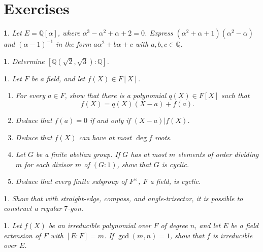 \documentclass[a4paper,11pt,final,openany]{memoir}
\newtheorem{exercise}[Y]{}
\theoremstyle{nonumberplain}
\begin{document}
\section{Exercises}

\begin{exercise}
\label{x1} Let $E={\mathbb{Q}}[\alpha]$, where $\alpha^{3}-\alpha^{2}%
+\alpha+2=0$. Express $(\alpha^{2}+\alpha+1)(\alpha^{2}-\alpha)$ and\linebreak
$(\alpha-1)^{-1}$ in the form $a\alpha^{2}+b\alpha+c$ with $a,b,c\in
{\mathbb{Q}}$.
\end{exercise}

\begin{exercise}
\label{x2} Determine $[{\mathbb{Q}}(\sqrt{2},\sqrt{3})\colon{\mathbb{Q}}]$.
\end{exercise}

\begin{exercise}
\label{x3}Let $F$ be a field, and let $f(X)\in F[X]$.

\begin{enumerate}
\item For every $a\in F$, show that there is a polynomial $q(X )\in F[X]$ such
that
\[
f(X)=q(X)(X-a)+f(a).
\]


\item Deduce that $f(a)=0$ if and only if $(X-a)|f(X)$.

\item Deduce that $f(X)$ can have at most $\deg f$ roots.

\item Let $G$ be a finite abelian group. If $G$ has at most $m$ elements of
order dividing $m$ for each divisor $m$ of $(G\colon1)$, show that $G$ is cyclic.

\item Deduce that every finite subgroup of $F^{\times}$, $F$ a field, is cyclic.
\end{enumerate}
\end{exercise}

\begin{exercise}
\label{x4}Show that with straight-edge, compass, and angle-trisector, it is
possible to construct a regular $7$-gon.
\end{exercise}

\begin{exercise}
\label{x4a}Let $f(X)$ be an irreducible polynomial over $F$ of degree $n$, and
let $E$ be a field extension of $F$ with $[E:F]=m$. If $\gcd(m,n)=1$, show
that $f$ is irreducible over $E$.
\end{exercise}
\end{document}
